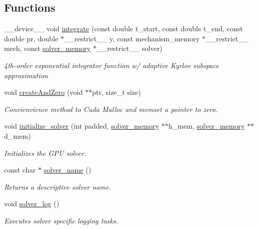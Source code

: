 \subsection*{Functions}
\begin{DoxyCompactItemize}
\item 
\+\_\+\+\_\+device\+\_\+\+\_\+ void \hyperlink{namespaceexp4cu_aac3abe15ef50061cdfe24ed7d9d64b7a}{integrate} (const double t\+\_\+start, const double t\+\_\+end, const double pr, double $\ast$\+\_\+\+\_\+restrict\+\_\+\+\_\+ y, const mechanism\+\_\+memory $\ast$\+\_\+\+\_\+restrict\+\_\+\+\_\+ mech, const \hyperlink{structexp4cu_1_1solver__memory}{solver\+\_\+memory} $\ast$\+\_\+\+\_\+restrict\+\_\+\+\_\+ solver)
\begin{DoxyCompactList}\small\item\em 4th-\/order exponential integrator function w/ adaptive Kyrlov subspace approximation \end{DoxyCompactList}\item 
void \hyperlink{namespaceexp4cu_abcdabb48b002afcaf4520f85bb06c156}{create\+And\+Zero} (void $\ast$$\ast$ptr, size\+\_\+t size)
\begin{DoxyCompactList}\small\item\em Convienvience method to Cuda Malloc and memset a pointer to zero. \end{DoxyCompactList}\item 
void \hyperlink{namespaceexp4cu_aa57e5681ad1b4e46c67d24d12d64e435}{initialize\+\_\+solver} (int padded, \hyperlink{structexp4cu_1_1solver__memory}{solver\+\_\+memory} $\ast$$\ast$h\+\_\+mem, \hyperlink{structexp4cu_1_1solver__memory}{solver\+\_\+memory} $\ast$$\ast$d\+\_\+mem)
\begin{DoxyCompactList}\small\item\em Initializes the G\+PU solver. \end{DoxyCompactList}\item 
const char $\ast$ \hyperlink{namespaceexp4cu_ad9fad26aa869ef1c6b7fc061e1e6abc3}{solver\+\_\+name} ()
\begin{DoxyCompactList}\small\item\em Returns a descriptive solver name. \end{DoxyCompactList}\item 
void \hyperlink{namespaceexp4cu_a042f555823c136890f60ab28454daf9e}{solver\+\_\+log} ()
\begin{DoxyCompactList}\small\item\em Executes solver specific logging tasks. \end{DoxyCompactList}\item 
$$
\end{DoxyCompactItemize}
